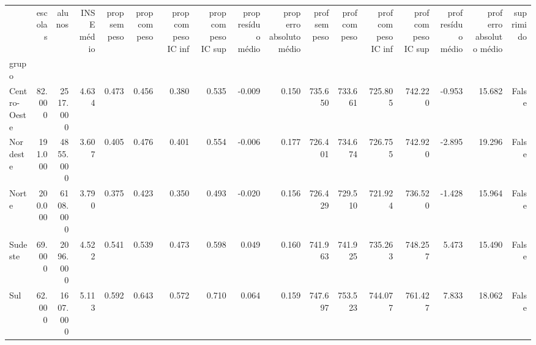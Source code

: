 \begin{tabular}{lrrrrrrrrrrrrrrrr}
\toprule
 & escolas & alunos & INSE médio & prop sem peso & prop com peso & prop com peso IC inf & prop com peso IC sup & prop resíduo médio & prop erro absoluto médio & prof sem peso & prof com peso & prof com peso IC inf & prof com peso IC sup & prof resíduo médio & prof erro absoluto médio & suprimido \\
grupo &  &  &  &  &  &  &  &  &  &  &  &  &  &  &  &  \\
\midrule
Centro-Oeste & 82.000 & 2517.000 & 4.634 & 0.473 & 0.456 & 0.380 & 0.535 & -0.009 & 0.150 & 735.650 & 733.661 & 725.805 & 742.220 & -0.953 & 15.682 & False \\
Nordeste & 191.000 & 4855.000 & 3.607 & 0.405 & 0.476 & 0.401 & 0.554 & -0.006 & 0.177 & 726.401 & 734.674 & 726.755 & 742.920 & -2.895 & 19.296 & False \\
Norte & 200.000 & 6108.000 & 3.790 & 0.375 & 0.423 & 0.350 & 0.493 & -0.020 & 0.156 & 726.429 & 729.510 & 721.924 & 736.520 & -1.428 & 15.964 & False \\
Sudeste & 69.000 & 2096.000 & 4.522 & 0.541 & 0.539 & 0.473 & 0.598 & 0.049 & 0.160 & 741.963 & 741.925 & 735.263 & 748.257 & 5.473 & 15.490 & False \\
Sul & 62.000 & 1607.000 & 5.113 & 0.592 & 0.643 & 0.572 & 0.710 & 0.064 & 0.159 & 747.697 & 753.523 & 744.077 & 761.427 & 7.833 & 18.062 & False \\
\bottomrule
\end{tabular}
